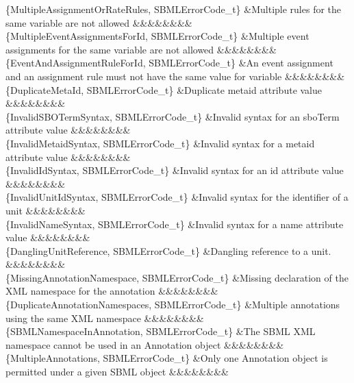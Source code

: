 \begin{DoxyParagraph}{}
\begin{longtabu}
\{Multiple\+Assignment\+Or\+Rate\+Rules, S\+B\+M\+L\+Error\+Code\+\_\+t\} &Multiple rules for the same variable are not allowed &&&&&&&&\\
\{Multiple\+Event\+Assignments\+For\+Id, S\+B\+M\+L\+Error\+Code\+\_\+t\} &Multiple event assignments for the same variable are not allowed &&&&&&&&\\
\{Event\+And\+Assignment\+Rule\+For\+Id, S\+B\+M\+L\+Error\+Code\+\_\+t\} &An event assignment and an assignment rule must not have the same value for \textquotesingle{}variable\textquotesingle{} &&&&&&&&\\
\{Duplicate\+Meta\+Id, S\+B\+M\+L\+Error\+Code\+\_\+t\} &Duplicate \textquotesingle{}metaid\textquotesingle{} attribute value &&&&&&&&\\
\{Invalid\+S\+B\+O\+Term\+Syntax, S\+B\+M\+L\+Error\+Code\+\_\+t\} &Invalid syntax for an \textquotesingle{}sbo\+Term\textquotesingle{} attribute value &&&&&&&&\\
\{Invalid\+Metaid\+Syntax, S\+B\+M\+L\+Error\+Code\+\_\+t\} &Invalid syntax for a \textquotesingle{}metaid\textquotesingle{} attribute value &&&&&&&&\\
\{Invalid\+Id\+Syntax, S\+B\+M\+L\+Error\+Code\+\_\+t\} &Invalid syntax for an \textquotesingle{}id\textquotesingle{} attribute value &&&&&&&&\\
\{Invalid\+Unit\+Id\+Syntax, S\+B\+M\+L\+Error\+Code\+\_\+t\} &Invalid syntax for the identifier of a unit &&&&&&&&\\
\{Invalid\+Name\+Syntax, S\+B\+M\+L\+Error\+Code\+\_\+t\} &Invalid syntax for a \textquotesingle{}name\textquotesingle{} attribute value &&&&&&&&\\
\{Dangling\+Unit\+Reference, S\+B\+M\+L\+Error\+Code\+\_\+t\} &Dangling reference to a unit. &&&&&&&&\\
\{Missing\+Annotation\+Namespace, S\+B\+M\+L\+Error\+Code\+\_\+t\} &Missing declaration of the X\+ML namespace for the annotation &&&&&&&&\\
\{Duplicate\+Annotation\+Namespaces, S\+B\+M\+L\+Error\+Code\+\_\+t\} &Multiple annotations using the same X\+ML namespace &&&&&&&&\\
\{S\+B\+M\+L\+Namespace\+In\+Annotation, S\+B\+M\+L\+Error\+Code\+\_\+t\} &The S\+B\+ML X\+ML namespace cannot be used in an Annotation object &&&&&&&&\\
\{Multiple\+Annotations, S\+B\+M\+L\+Error\+Code\+\_\+t\} &Only one Annotation object is permitted under a given S\+B\+ML object &&&&&&&&\\

\end{longtabu}
\end{DoxyParagraph}
